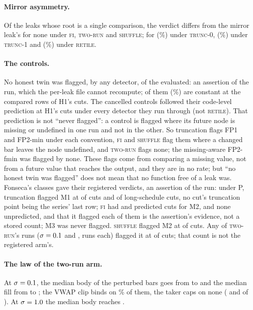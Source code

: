\documentclass[11pt]{article}
\newcommand{\FI}{\textsc{fi}}
\newcommand{\TZ}{\textsc{trunc-0}}
\newcommand{\TO}{\textsc{trunc-1}}
\newcommand{\RT}{\textsc{retile}}
\newcommand{\TR}{\textsc{two-run}}
\newcommand{\SH}{\textsc{shuffle}}
\newcommand{\pct}{\%}
\begin{document}
\paragraph{Mirror asymmetry.} Of the \NumCMirLeaks{} leaks whose root is a single comparison, the
verdict differs from the mirror leak's for none under \FI, \TR{} and \SH; for \NumCMirTz{}
(\NumCMirTzPct\pct) under \TZ, \NumCMirTo{} (\NumCMirToPct\pct) under \TO{} and \NumCMirRt{}
(\NumCMirRtPct\pct) under \RT.

\paragraph{The controls.} No honest twin was flagged, by any detector, of the \NumCTwinsEval{}
evaluated: an assertion of the run, which the per-leak file cannot recompute; \NumCTwinsConst{} of
them (\NumCTwinsConstPct\pct) are constant at the compared rows of H1's cuts. The cancelled controls followed their code-level prediction at H1's cuts under every detector they
run through (not \RT). That prediction is not ``never flagged'': a control is flagged where its
future node is missing or undefined in one run and not in the other. So truncation flags FP1 and
FP2-min under each convention, \FI{} and \SH{} flag them where a changed bar leaves the node
undefined, and \TR{} flags none; the missing-aware FP2-fmin was flagged by none. These flags come
from comparing a missing value, not from a future value that reaches the output, and they are in
no rate; but ``no honest twin was flagged'' does not mean that no function free of a leak was. Fonseca's classes gave their registered verdicts, an assertion of the
run: under P, truncation flagged M1 at \NumCMoneP{} of \NumHoneCutsN{} cuts and \NumCMonePLong{} of
\NumLongTotal{} long-schedule cuts, no cut's truncation point being the series' last row; \FI{} had
\NumCMtwoFi{} and \NumCMtwoFiLong{} predicted cuts for M2, and none unpredicted, and that it flagged
each of them is the assertion's evidence, not a stored count; M3 was never flagged. \SH{} flagged
M2 at \NumCMtwoSh{} of \NumHoneCutsN{} cuts. Any of \TR's \NumMtwoRunsAll{} runs ($\sigma =
0.1$ and \NumSigmaHi, \NumTwoRunMany{} runs each) flagged it at \NumCMtwoTr{} of
\NumHoneCutsN{} cuts; that count is not the registered arm's.

\paragraph{The law of the two-run arm.} At $\sigma=0.1$, the median body of the perturbed bars goes from
\NumCBodyBefore{} to \NumCBodyAfter{} and the median fill from \NumCFillBefore{} to
\NumCFillAfter; the VWAP clip binds on \NumCVwapClip\pct{} of them, the taker caps on none
(\NumCTakerBase{} and \NumCTakerQuote{} of \NumCRepairBars). At $\sigma=1.0$ the median body
reaches \NumCBodyAfterHi.
\end{document}
